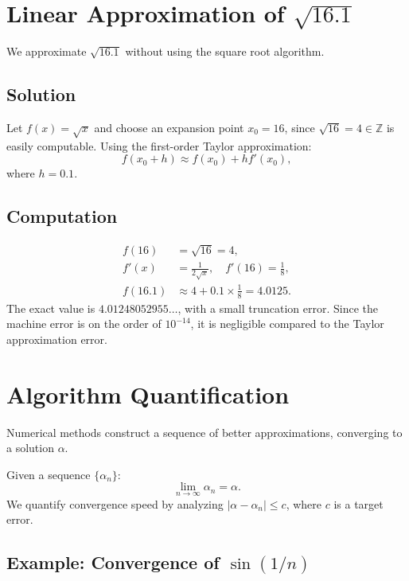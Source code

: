 \section{Linear Approximation of $\sqrt{16.1}$}

We approximate $\sqrt{16.1}$ without using the square root algorithm.

\subsection{Solution}
Let $f(x) = \sqrt{x}$ and choose an expansion point $x_0 = 16$, since 
$\sqrt{16} = 4 \in \mathbb{Z}$ is easily computable. Using the first-order 
Taylor approximation:
\begin{equation*}
    f(x_0 + h) \approx f(x_0) + h f'(x_0),
\end{equation*}
where $h = 0.1$.

\subsection{Computation}
\begin{align*}
    f(16) &= \sqrt{16} = 4, \\
    f'(x) &= \frac{1}{2\sqrt{x}}, \quad f'(16) = \frac{1}{8}, \\
    f(16.1) &\approx 4 + 0.1 \times \frac{1}{8} = 4.0125.
\end{align*}
The exact value is $4.01248052955\dots$, with a small truncation error.
Since the machine error is on the order of $10^{-14}$, it is negligible compared 
to the Taylor approximation error.

\section{Algorithm Quantification}

Numerical methods construct a sequence of better approximations, converging to 
a solution $\alpha$.

Given a sequence $\{\alpha_n\}$:
\begin{equation*}
    \lim_{n\to\infty} \alpha_n = \alpha.
\end{equation*}
We quantify convergence speed by analyzing $|\alpha - \alpha_n| \leq c$, where 
$c$ is a target error.

\subsection{Example: Convergence of $\sin(1/n)$}

